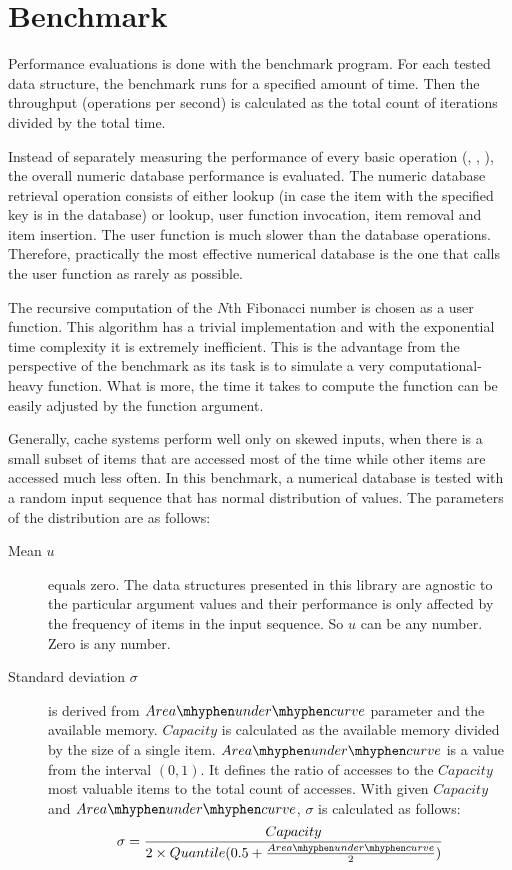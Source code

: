 \section{Benchmark}

Performance evaluations is done with the benchmark program. For each tested data structure, the benchmark runs for a specified amount of time. Then the throughput (operations per second) is calculated as the total count of iterations divided by the total time.

Instead of separately measuring the performance of every basic operation (\findop, \insertop, \removeop), the overall numeric database performance is evaluated. The numeric database retrieval operation consists of either lookup (in case the item with the specified key is in the database) or lookup, user function invocation, item removal and item insertion. The user function is much slower than the database operations. Therefore, practically the most effective numerical database is the one that calls the user function as rarely as possible.

The recursive computation of the $N$th Fibonacci number is chosen as a user function. This algorithm has a trivial implementation and with the exponential time complexity it is extremely inefficient. This is the advantage from the perspective of the benchmark as its task is to simulate a very computational-heavy function. What is more, the time it takes to compute the function can be easily adjusted by the function argument.

Generally, cache systems perform well only on skewed inputs, when there is a small subset of items that are accessed most of the time while other items are accessed much less often. In this benchmark, a numerical database is tested with a random input sequence that has normal distribution of values. The parameters of the distribution are as follows:
\begin{description}
\item[Mean $u$] equals zero. The data structures presented in this library are agnostic to the particular argument values and their performance is only affected by the frequency of items in the input sequence. So $u$ can be any number. Zero is any number.

\item [Standard deviation $\sigma$] is derived from $Area{\mhyphen}under{\mhyphen}curve$ parameter and the available memory. $Capacity$ is calculated as the available memory divided by the size of a single item. $Area{\mhyphen}under{\mhyphen}curve$ is a value from the interval $(0,1)$. It defines the ratio of accesses to the $Capacity$ most valuable items to the total count of accesses. With given $Capacity$ and $Area{\mhyphen}under{\mhyphen}curve$, $\sigma$ is calculated as follows:
\begin{equation}
 \sigma = \frac{Capacity}{2 \times Quantile(0.5 + \frac{Area{\mhyphen}under{\mhyphen}curve}{2})}
 \end{equation}
\end{description}

